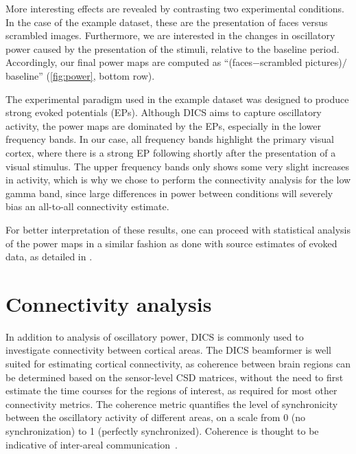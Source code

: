\documentclass[utf8]{frontiersSCNS}
\renewcommand{\cite}[1]{~\citep{#1}}
\newcommand{\textcite}[1]{\citet{#1}}
\begin{document}
More interesting effects are revealed by contrasting two experimental conditions.
In the case of the example dataset, these are the presentation of faces versus scrambled images.
Furthermore, we are interested in the changes in oscillatory power caused by the presentation of the stimuli, relative to the baseline period.
Accordingly, our final power maps are computed as ``(faces$-$scrambled pictures)$/$baseline'' (\autoref{fig:power}, bottom row).

The experimental paradigm used in the example dataset was designed to produce strong evoked potentials (EPs).
Although DICS aims to capture oscillatory activity, the power maps are dominated by the EPs, especially in the lower frequency bands.
In our case, all frequency bands highlight the primary visual cortex, where there is a strong EP following shortly after the presentation of a visual stimulus.
The upper frequency bands only shows some very slight increases in activity, which is why we chose to perform the connectivity analysis for the low gamma band, since large differences in power between conditions will severely bias an all-to-all connectivity estimate.

For better interpretation of these results, one can proceed with statistical analysis of the power maps in a similar fashion as done with source estimates of evoked data, as detailed in \textcite{Jas2017}.


\section{Connectivity analysis}\label{connectivity}

In addition to analysis of oscillatory power, DICS is commonly used to investigate connectivity between cortical areas.
The DICS beamformer is well suited for estimating cortical connectivity, as coherence between brain regions can be determined based on the sensor-level CSD matrices, without the need to first estimate the time courses for the regions of interest, as required for most other connectivity metrics.
The coherence metric quantifies the level of synchronicity between the oscillatory activity of different areas, on a scale from 0 (no synchronization) to 1 (perfectly synchronized).
Coherence is thought to be indicative of inter-areal communication\cite{Fries2005}.
\end{document}
